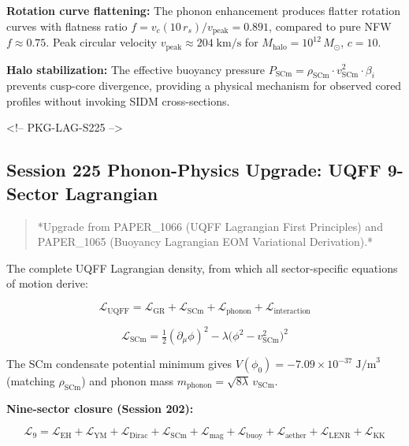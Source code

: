 \documentclass[12pt,a4paper]{article}
\begin{document}
\textbf{Rotation curve flattening:} The phonon enhancement produces flatter rotation curves with flatness ratio $f = v_c(10\,r_s)/v_{\text{peak}} = 0.891$, compared to pure NFW $f \approx 0.75$.  Peak circular velocity $v_{\text{peak}} \approx 204\;\text{km/s}$ for $M_{\text{halo}} = 10^{12}\,M_\odot$, $c = 10$.

\textbf{Halo stabilization:} The effective buoyancy pressure $P_{\text{SCm}} = \rho_{\text{SCm}} \cdot v_{\text{SCm}}^2 \cdot \beta_i$ prevents cusp-core divergence, providing a physical mechanism for observed cored profiles without invoking SIDM cross-sections.

<!-- PKG-LAG-S225 -->

\subsection{Session 225 Phonon-Physics Upgrade: UQFF 9-Sector Lagrangian}

\begin{quote}
*Upgrade from PAPER\_1066 (UQFF Lagrangian First Principles) and
PAPER\_1065 (Buoyancy Lagrangian EOM Variational Derivation).*
\end{quote}

The complete UQFF Lagrangian density, from which all sector-specific equations of motion derive:

\begin{equation}
\mathcal{L}_{\text{UQFF}} = \mathcal{L}_{\text{GR}} + \mathcal{L}_{\text{SCm}} + \mathcal{L}_{\text{phonon}} + \mathcal{L}_{\text{interaction}}
\end{equation}

\begin{equation}
\mathcal{L}_{\text{SCm}} = \tfrac{1}{2}(\partial_\mu \phi)^2 - \lambda\bigl(\phi^2 - v_{\text{SCm}}^2\bigr)^2
\end{equation}

The SCm condensate potential minimum gives $V(\phi_0) = -7.09 \times 10^{-37}\;\text{J/m}^3$ (matching $\rho_{\text{SCm}}$) and phonon mass $m_{\text{phonon}} = \sqrt{8\lambda}\,v_{\text{SCm}}$.

\textbf{Nine-sector closure (Session 202):}

\begin{equation}
\mathcal{L}_{9} = \mathcal{L}_{\text{EH}} + \mathcal{L}_{\text{YM}} + \mathcal{L}_{\text{Dirac}} + \mathcal{L}_{\text{SCm}} + \mathcal{L}_{\text{mag}} + \mathcal{L}_{\text{buoy}} + \mathcal{L}_{\text{aether}} + \mathcal{L}_{\text{LENR}} + \mathcal{L}_{\text{KK}}
\end{equation}
\end{document}
